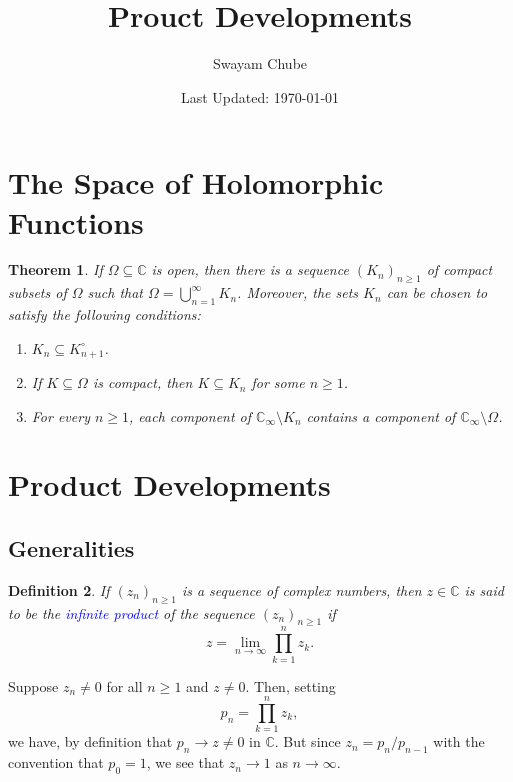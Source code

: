 \documentclass[11pt]{article}
\theoremstyle{thmstyle}
\newtheorem{theorem}{Theorem}[section]
\theoremstyle{defstyle}
\newtheorem{definition}[theorem]{Definition}
\newcommand{\bbC}{\mathbb{C}}
\newcommand{\define}[1]{\textcolor{blue}{\textit{#1}}}
\renewcommand{\ge}{\geqslant}
\begin{document}
\title{Prouct Developments}
\author{Swayam Chube}
\date{Last Updated: \today}
\maketitle

\section{The Space of Holomorphic Functions}

\begin{theorem}
    If $\Omega\subseteq\bbC$ is open, then there is a sequence $(K_n)_{n\ge 1}$ of compact subsets of $\Omega$ such that $\displaystyle\Omega = \bigcup_{n = 1}^\infty K_n$. Moreover, the sets $K_n$ can be chosen to satisfy the following conditions: 
    \begin{enumerate}[label=(\roman*)]
        \item $K_n\subseteq K_{n + 1}^\circ$.
        \item If $K\subseteq\Omega$ is compact, then $K\subseteq K_n$ for some $n\ge 1$. 
        \item For every $n\ge 1$, each component of $\bbC_\infty\setminus K_n$ contains a component of $\bbC_\infty\setminus\Omega$.
    \end{enumerate}
\end{theorem}

\section{Product Developments}

\subsection{Generalities}

\begin{definition}
    If $(z_n)_{n\ge 1}$ is a sequence of complex numbers, then $z\in\bbC$ is said to be the \define{infinite product} of the sequence $(z_n)_{n\ge 1}$ if 
    \begin{equation*}
        z = \lim_{n\to\infty}\prod_{k = 1}^n z_k.
    \end{equation*}
\end{definition}

Suppose $z_n\ne 0$ for all $n\ge 1$ and $z\ne 0$. Then, setting 
\begin{equation*}
    p_n = \prod_{k = 1}^n z_k,
\end{equation*}
we have, by definition that $p_n\to z\ne 0$ in $\bbC$. But since $z_n = p_n/p_{n - 1}$ with the convention that $p_0 = 1$, we see that $z_n\to 1$ as $n\to\infty$.
\end{document}
